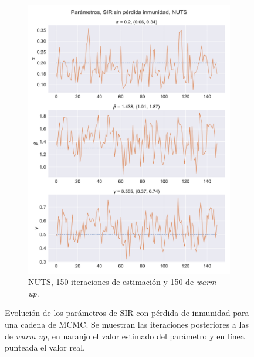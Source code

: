 \begin{figure}[h]
\begin{subfigure}[b]{0.49\linewidth}
        \includegraphics[width=\linewidth]{img/content/chapter4/NUTS_sir_rec_params_trace.pdf}
        \caption{NUTS, 150 iteraciones de estimación y 150 de \textit{warm up}.}
        \label{fig:NUTS_sir_rec_params_trace}
    \end{subfigure}
    \caption{Evolución de los parámetros de SIR con pérdida de inmunidad para una cadena de MCMC. Se muestran las iteraciones posteriores a las de \textit{warm up}, en naranjo el valor estimado del parámetro y en línea punteada el valor real.}
    \label{fig:MCMC_sir_params_trace}
\end{figure}

